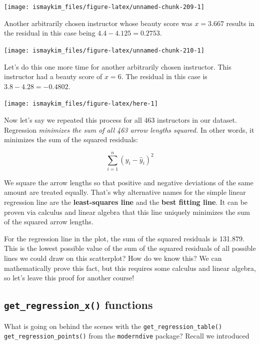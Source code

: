 \documentclass[12pt,]{krantz}
\begin{document}
\begin{center}\texttt{[image: ismaykim\_files/figure-latex/unnamed-chunk-209-1]} \end{center}

Another arbitrarily chosen instructor whose beauty score was \(x=3.667\)
results in the residual in this case being \(4.4 - 4.125 = 0.2753\).

\begin{center}\texttt{[image: ismaykim\_files/figure-latex/unnamed-chunk-210-1]} \end{center}

Let's do this one more time for another arbitrarily chosen instructor.
This instructor had a beauty score of \(x = 6\). The residual in this
case is \(3.8 - 4.28 = -0.4802\).

\begin{center}\texttt{[image: ismaykim\_files/figure-latex/here-1]} \end{center}

Now let's say we repeated this process for all 463 instructors in our
dataset. Regression \emph{minimizes the sum of all 463 arrow lengths
squared.} In other words, it minimizes the sum of the squared residuals:

\[
\sum_{i=1}^{n}(y_i - \widehat{y}_i)^2
\]

We square the arrow lengths so that positive and negative deviations of
the same amount are treated equally. That's why alternative names for
the simple linear regression line are the \textbf{least-squares line}
and the \textbf{best fitting line}. It can be proven via calculus and
linear algebra that this line uniquely minimizes the sum of the squared
arrow lengths.

For the regression line in the plot, the sum of the squared residuals is
131.879. This is the lowest possible value of the sum of the squared
residuals of all possible lines we could draw on this scatterplot? How
do we know this? We can mathematically prove this fact, but this
requires some calculus and linear algebra, so let's leave this proof for
another course!

\subsection{\texorpdfstring{\texttt{get\_regression\_x()}
functions}{get\_regression\_x() functions}}\label{underthehood}

What is going on behind the scenes with the
\texttt{get\_regression\_table()} \texttt{get\_regression\_points()}
from the \texttt{moderndive} package? Recall we introduced
\end{document}

